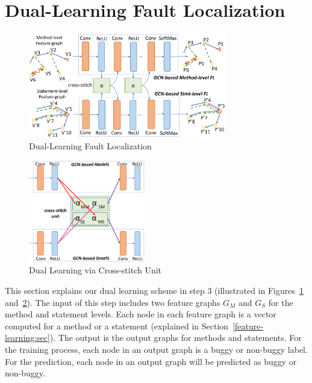 \section{Dual-Learning Fault Localization}

\begin{figure}[t]
	\centering
	\includegraphics[width=3.4in]{graphs/dual-learning.png}
	\caption{Dual-Learning Fault Localization}
	\label{dual-learning}
\end{figure}

\begin{figure}[t]
	\centering
	\includegraphics[width=2in]{graphs/cross-stitch.png}
	\caption{Dual Learning via Cross-stitch Unit}
	\label{cross-stitch}
\end{figure}

This section explains our dual learning scheme in step 3 (illustrated
in Figures~\ref{dual-learning} and~\ref{cross-stitch}). The input of
this step includes two feature graphs $G_M$ and $G_S$ for the method
and statement levels. Each node in each feature graph is a vector
computed for a method or a statement (explained in
Section~\ref{feature-learning:sec}). The output is the output graphs
for methods and statements. For the training process, each node in an
output graph is a buggy or non-buggy label.  For the prediction, each
node in an output graph will be predicted as buggy or non-buggy.



